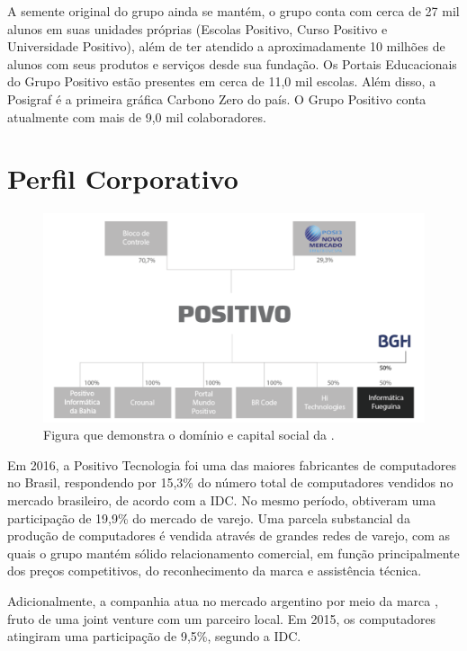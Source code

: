 A semente original do grupo ainda se mantém, o grupo conta com cerca de 27 mil alunos em suas unidades próprias (Escolas Positivo, Curso Positivo e Universidade Positivo), além de ter atendido a aproximadamente 10 milhões de alunos com seus produtos e serviços desde sua fundação. Os Portais Educacionais do Grupo Positivo estão presentes em cerca de 11,0 mil escolas. Além disso, a Posigraf é a primeira gráfica Carbono Zero do país. O Grupo Positivo conta atualmente com mais de 9,0 mil colaboradores.

\section{Perfil Corporativo}

\begin{figure}[h]
\begin{centering}
\includegraphics[width=1.0\textwidth]{Img/Corporativo}
\caption{Figura que demonstra o domínio e capital social da \nomeCompletoPositivo{}.}
\par\end{centering}
\end{figure}

Em 2016, a Positivo Tecnologia foi uma das maiores fabricantes de computadores no Brasil, respondendo por 15,3\% do número total de computadores vendidos no mercado brasileiro, de acordo com a IDC. No mesmo período, obtiveram uma participação de 19,9\% do mercado de varejo. Uma parcela substancial da produção de computadores é vendida através de grandes redes de varejo, com as quais o grupo mantém sólido relacionamento comercial, em função principalmente dos preços competitivos, do reconhecimento da marca e assistência técnica.

Adicionalmente, a companhia atua no mercado argentino por meio da marca \nomePositivoAr{}, fruto de uma joint venture com um parceiro local. Em 2015, os computadores \nomePositivoAr{} atingiram uma participação de 9,5\%, segundo a IDC.

